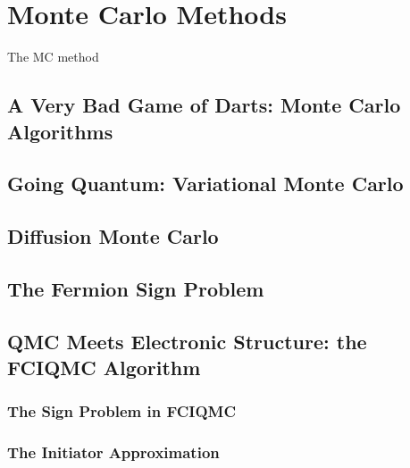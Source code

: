 \chapter{Monte Carlo Methods}
\label{chap:qmc}

The \gls{MC} method

\section{A Very Bad Game of Darts: Monte Carlo Algorithms}

\section{Going Quantum: Variational Monte Carlo}

\section{Diffusion Monte Carlo}

\section{The Fermion Sign Problem}

\section{QMC Meets Electronic Structure: the FCIQMC Algorithm}

\subsection{The Sign Problem in FCIQMC}

\subsection{The Initiator Approximation}
